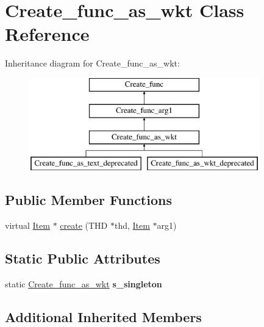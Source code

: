 \hypertarget{classCreate__func__as__wkt}{}\section{Create\+\_\+func\+\_\+as\+\_\+wkt Class Reference}
\label{classCreate__func__as__wkt}
Inheritance diagram for Create\+\_\+func\+\_\+as\+\_\+wkt\+:\begin{figure}[H]
\begin{center}
\leavevmode
\includegraphics[height=4.000000cm]{classCreate__func__as__wkt}
\end{center}
\end{figure}
\subsection*{Public Member Functions}
\begin{DoxyCompactItemize}
\item 
virtual \mbox{\hyperlink{classItem}{Item}} $\ast$ \mbox{\hyperlink{classCreate__func__as__wkt_ab99b74b6521f9894ce13159797180093}{create}} (T\+HD $\ast$thd, \mbox{\hyperlink{classItem}{Item}} $\ast$arg1)
\end{DoxyCompactItemize}
\subsection*{Static Public Attributes}
\begin{DoxyCompactItemize}
\item 
\mbox{\label{classCreate__func__as__wkt_a274c21619f5461aa5b84a5679cbef3bb}} 
static \mbox{\hyperlink{classCreate__func__as__wkt}{Create\+\_\+func\+\_\+as\+\_\+wkt}} {\bfseries s\+\_\+singleton}
\end{DoxyCompactItemize}
\subsection*{Additional Inherited Members}


